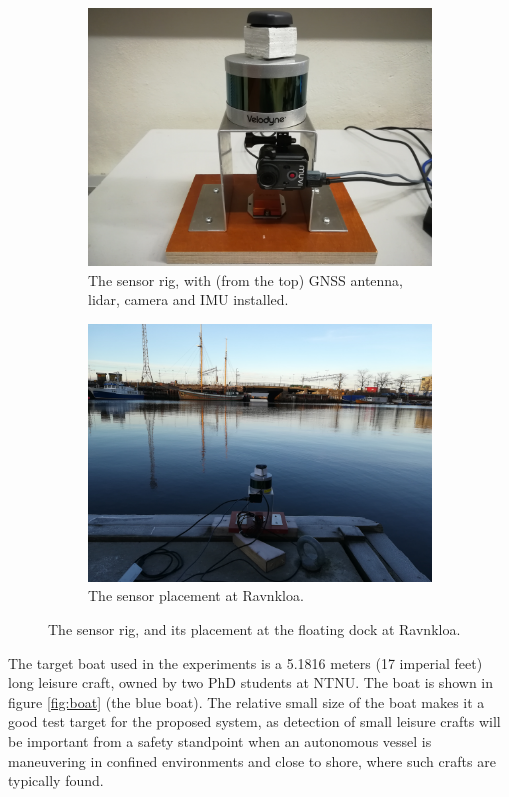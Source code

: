\begin{figure}[H]
	\centering
	\begin{subfigure}{.5\textwidth}
		\centering
		\includegraphics[width=.8\linewidth]{fig/sensor_rig.jpg}
		\caption{The sensor rig, with (from the top) GNSS antenna, lidar, camera and IMU installed.}
		\label{fig:sub_sensorrig}
	\end{subfigure}%
	\begin{subfigure}{.5\textwidth}
		\centering
		\includegraphics[width=.8\linewidth]{fig/sensors_ravnkloa.jpg}
		\caption{The sensor placement at Ravnkloa.}
		\label{fig:sub_sensor_ravnkloa}
	\end{subfigure}
	\caption{The sensor rig, and its placement at the floating dock at Ravnkloa.}
	\label{fig:sensors_ravnkloa}
\end{figure}
The target boat used in the experiments is a 5.1816 meters (17 imperial feet) long  leisure craft, owned by two PhD students at NTNU.
The boat is shown in figure \ref{fig:boat} (the blue boat). The relative small size of the boat makes it a good test target for the proposed system, as detection of small leisure crafts will be important from a safety standpoint when an autonomous vessel is maneuvering in confined environments and close to shore, where such crafts are typically found.

